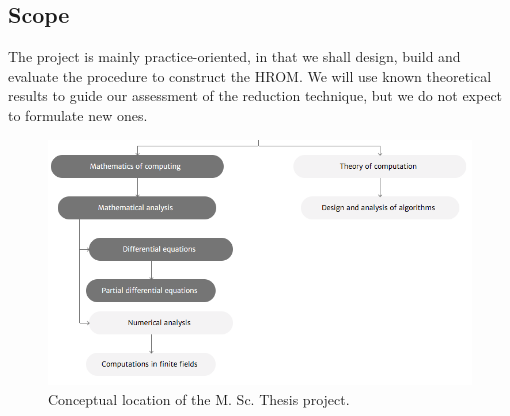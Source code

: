
\subsection{Scope}
The project is mainly practice-oriented, in that we shall design, 
build and evaluate the procedure to construct the HROM.
We will use known theoretical results 
to guide our assessment of the reduction technique, 
but we do not expect to formulate new ones.

\begin{figure}[h]
   \includegraphics[width=\columnwidth]{research_project/figures/index.png}
   \caption{Conceptual location of the M. Sc. Thesis project.}
\end{figure}



